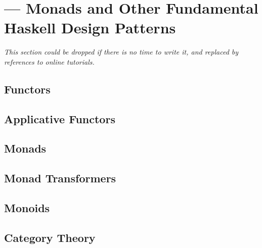 \chapter[--- Monads and Other Fundamental Haskell Design Patterns]{--- Monads and Other Fundamental Haskell Design Patterns}
\label{app:monads}

\emph{This section could be dropped if there is no time to write it, and replaced by references to online tutorials.}

\section{Functors}

\section{Applicative Functors}

\section{Monads}

\section{Monad Transformers}

\section{Monoids}

\section{Category Theory}